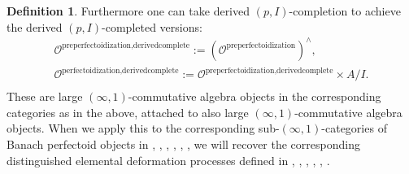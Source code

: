 \documentclass[11pt]{book}
\theoremstyle{definition}
\newtheorem{definition}[theorem]{Definition}
\numberwithin{equation}{section}
\begin{document}
\begin{definition}
Furthermore one can take derived $(p,I)$-completion to achieve the derived $(p,I)$-completed versions:
\begin{align}
\mathcal{O}^\text{preperfectoidization,derivedcomplete}:=(\mathcal{O}^\text{preperfectoidization})^{\wedge},\\
\mathcal{O}^\text{perfectoidization,derivedcomplete}:=\mathcal{O}^\text{preperfectoidization,derivedcomplete}\times A/I.\\
\end{align}
These are large $(\infty,1)$-commutative algebra objects in the corresponding categories as in the above, attached to also large $(\infty,1)$-commutative algebra objects. When we apply this to the corresponding sub-$(\infty,1)$-categories of Banach perfectoid objects in \cite{BMS2}, \cite{GR}, \cite{12KL1}, \cite{12KL2}, \cite{12Ked1}, \cite{12Sch3},  we will recover the corresponding distinguished elemental deformation processes defined in \cite{BMS2}, \cite{GR}, \cite{12KL1}, \cite{12KL2}, \cite{12Ked1}, \cite{12Sch3}. 
\end{definition}

\
\end{document}
